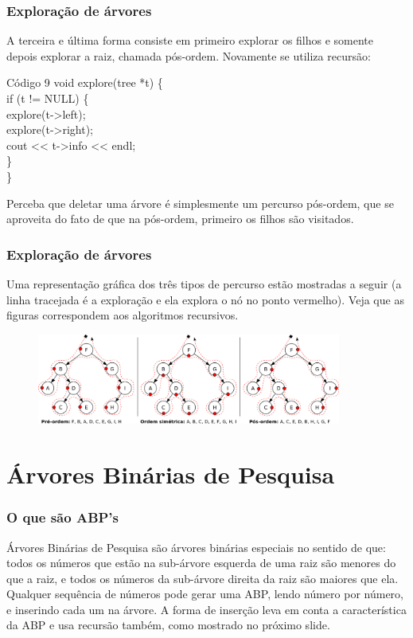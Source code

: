 \documentclass{beamer}
\begin{document}
	\begin{frame}
	\frametitle{Exploração de árvores}
		A terceira e última forma consiste em primeiro explorar os
		filhos e somente depois explorar a raiz, chamada pós-ordem.
		Novamente se utiliza recursão:
		\begin{block}{Código 9}
		\hspace{10 pt} void explore(tree *t) \{\\
		\hspace{20 pt} if (t != NULL) \{\\
		\hspace{30 pt} explore(t->left);\\
		\hspace{30 pt} explore(t->right);\\
		\hspace{30 pt} cout << t->info << endl;\\
		\hspace{20 pt} \}\\
		\hspace{10 pt} \}
		\end{block}
		Perceba que deletar uma árvore é simplesmente um
		percurso pós-ordem, que se aproveita do fato de que na
		pós-ordem, primeiro os filhos são visitados.
	\end{frame}

	\begin{frame}
	\frametitle{Exploração de árvores}
		Uma representação gráfica dos três tipos de percurso estão
		mostradas a seguir (a linha tracejada é a exploração e ela
		explora o nó no ponto vermelho). Veja que as figuras
		correspondem aos algoritmos recursivos.
		\begin{figure}[H]
			\centering
			\includegraphics[width=10cm]{tree_exploration.png}
		\end{figure}
	\end{frame}

	\section{Árvores Binárias de Pesquisa}

	\begin{frame}
	\frametitle{O que são ABP's}
		Árvores Binárias de Pesquisa são árvores binárias especiais
		no sentido de que: todos os números que estão na sub-árvore
		esquerda de uma raiz são menores do que a raiz, e todos os
		números da sub-árvore direita da raiz são maiores que ela.
		Qualquer sequência de números pode gerar uma ABP, lendo
		número por número, e inserindo cada um na árvore. A forma de
		inserção leva em conta a característica da ABP e usa recursão
		também, como mostrado no próximo slide.
	\end{frame}
\end{document}
